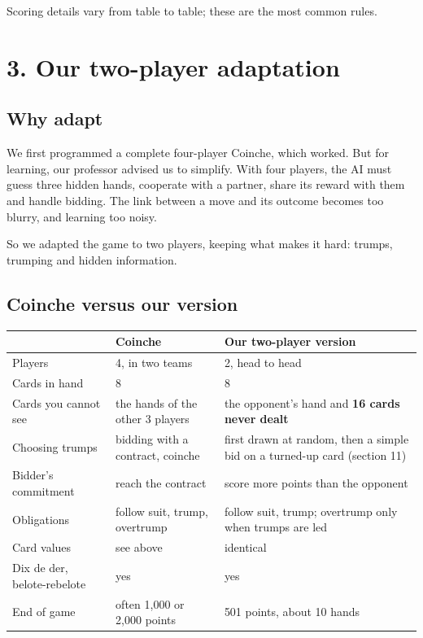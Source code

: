 Scoring details vary from table to table; these are the most common rules.

\section*{3. Our two-player adaptation}

\subsection*{Why adapt}

We first programmed a complete four-player Coinche, which worked. But for learning, our professor advised us to simplify. With four players, the AI must guess three hidden hands, cooperate with a partner, share its reward with them and handle bidding. The link between a move and its outcome becomes too blurry, and learning too noisy.

So we adapted the game to two players, keeping what makes it hard: trumps, trumping and hidden information.

\subsection*{Coinche versus our version}

\begin{table}[htbp]\centering\small\begin{tabularx}{\linewidth}{lXX}\toprule

 & Coinche & Our two-player version \\\midrule

Players & 4, in two teams & 2, head to head \\

Cards in hand & 8 & 8 \\

Cards you cannot see & the hands of the other 3 players & the opponent's hand and \textbf{16 cards never dealt} \\

Choosing trumps & bidding with a contract, coinche & first drawn at random, then a simple bid on a turned-up card (section 11) \\

Bidder's commitment & reach the contract & score more points than the opponent \\

Obligations & follow suit, trump, overtrump & follow suit, trump; overtrump only when trumps are led \\

Card values & see above & identical \\

Dix de der, belote-rebelote & yes & yes \\

End of game & often 1,000 or 2,000 points & 501 points, about 10 hands \\

\bottomrule\end{tabularx}\end{table}

